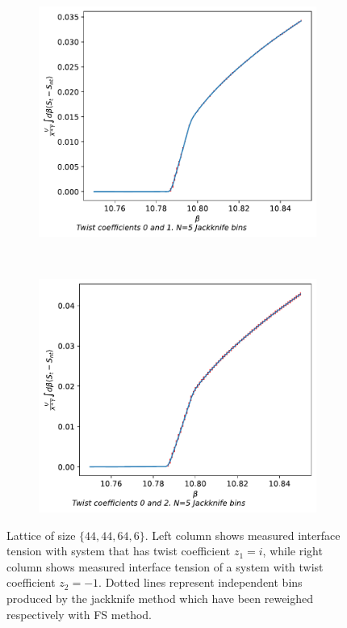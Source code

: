 \documentclass[english,twoside,openright]{UH_TCM_MSc}
\begin{document}
\begin{figure}[htpb]
    \begin{subfigure}[t]{0.5\textwidth}
        \centering
        \includegraphics[width=\textwidth]{final_plots/44_44_64/action_diff_int_0-1.pdf}
    \end{subfigure}%
    ~ 
    \begin{subfigure}[t]{0.5\textwidth}
        \centering
        \includegraphics[width=\textwidth]{final_plots/44_44_64/action_diff_int_0-2.pdf}
    \end{subfigure}
    \caption{Lattice of size $\{44,44,64,6\}$. Left column shows measured interface tension with system that has twist coefficient $z_1 = i$, while right column shows measured interface tension of a system with twist coefficient $z_2 = -1$. Dotted lines represent independent bins produced by the jackknife method which have been reweighed respectively with FS method.} 
    \label{fig:4444646}
\end{figure}
\end{document}

